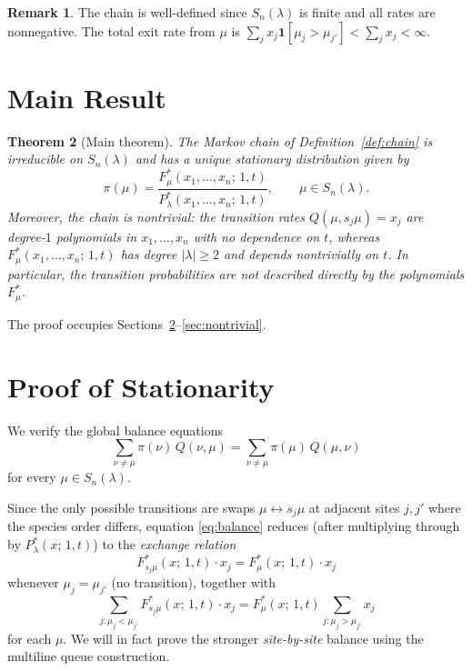 \documentclass[12pt]{article}
\newtheorem{theorem}{Theorem}
\theoremstyle{definition}
\newtheorem{remark}[theorem]{Remark}
\begin{document}
\begin{remark}
The chain is well-defined since $S_n(\lambda)$ is finite and all rates are
nonnegative.  The total exit rate from $\mu$ is $\sum_j x_j \mathbf{1}[\mu_j >
\mu_{j'}] < \sum_j x_j < \infty$.
\end{remark}

\section{Main Result}

\begin{theorem}[Main theorem]\label{thm:main}
The Markov chain of Definition~\ref{def:chain} is irreducible on $S_n(\lambda)$
and has a unique stationary distribution given by
\[
  \pi(\mu) = \frac{F^*_\mu(x_1,\dots,x_n;\,1,t)}{P^*_\lambda(x_1,\dots,x_n;\,1,t)},
  \qquad \mu \in S_n(\lambda).
\]
Moreover, the chain is \emph{nontrivial}: the transition rates $Q(\mu, s_j \mu)
= x_j$ are degree-$1$ polynomials in $x_1,\dots,x_n$ with no dependence on $t$,
whereas $F^*_\mu(x_1,\dots,x_n;\,1,t)$ has degree $|\lambda| \geq 2$ and
depends nontrivially on $t$.  In particular, the transition probabilities are not
described directly by the polynomials $F^*_\mu$.
\end{theorem}

The proof occupies Sections~\ref{sec:stationary}--\ref{sec:nontrivial}.

\section{Proof of Stationarity}\label{sec:stationary}

We verify the global balance equations
\begin{equation}\label{eq:balance}
  \sum_{\nu \neq \mu} \pi(\nu)\, Q(\nu, \mu)
  = \sum_{\nu \neq \mu} \pi(\mu)\, Q(\mu, \nu)
\end{equation}
for every $\mu \in S_n(\lambda)$.

Since the only possible transitions are swaps $\mu \leftrightarrow s_j \mu$ at
adjacent sites $j, j'$ where the species order differs, equation
\eqref{eq:balance} reduces (after multiplying through by
$P^*_\lambda(x;\,1,t)$) to the \emph{exchange relation}
\begin{equation}\label{eq:exchange}
  F^*_{s_j\mu}(x;\,1,t)\cdot x_j = F^*_\mu(x;\,1,t)\cdot x_j
\end{equation}
whenever $\mu_j = \mu_{j'}$ (no transition), together with
\begin{equation}\label{eq:flowbalance}
  \sum_{j : \mu_j < \mu_{j'}} F^*_{s_j\mu}(x;\,1,t)\cdot x_j
  = F^*_\mu(x;\,1,t) \sum_{j : \mu_j > \mu_{j'}} x_j
\end{equation}
for each $\mu$.  We will in fact prove the stronger \emph{site-by-site} balance
using the multiline queue construction.
\end{document}
